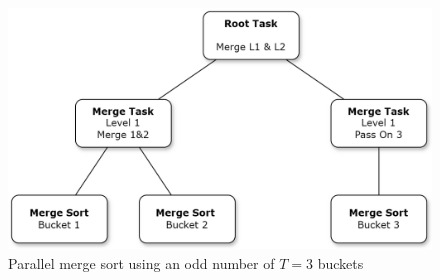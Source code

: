 \documentclass[twocolumn]{article}
\begin{document}
\begin{figure}[h]
\includegraphics[scale=0.175]{./figures/merge_sort_odd.png}
\centering
\caption{Parallel merge sort using an odd number of $T=3$ buckets}
\end{figure}
\end{document}
